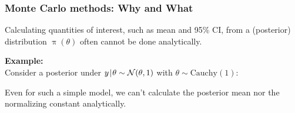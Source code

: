 \documentclass[18pt]{beamer}
\newcommand{\defineTightSpacing}{%
	\setlength{\abovedisplayskip}{.3\baselineskip}%
	\setlength{\belowdisplayskip}{.3\baselineskip}%
}
\newenvironment{tightEquation*}{%
	\defineTightSpacing%
	\begin{equation*}
}{
	\end{equation*} \ignorespacesafterend
}
\newcommand{\smallCap}[1]{{\small \MakeUppercase{#1}}}
\newcommand{\given}{\thinnerspace | \thinnerspace}
\newcommand{\thinnerspace}{\mskip.5\thinmuskip}
\newcommand{\normalDist}{\mathcal{N}}
\DeclareMathOperator{\density}{\pi}
\begin{document}
\begin{frame}
\frametitle{Monte Carlo methods: Why \textcolor{greyedOutThemecolor}{and What}}

Calculating quantities of interest, such as mean and 95\% \smallCap{ci}, from a (posterior) distribution $\density(\theta)$ often cannot be done analytically.
\medskip

\pause
\textbf{Example:}\\
Consider a posterior under $y \given \theta \sim \normalDist(\theta, 1)$ with $\theta \sim \mathrm{Cauchy}(1)$: %
Even for such a simple model, we can't calculate the posterior mean nor the normalizing constant analytically.

\end{frame}
\end{document}
